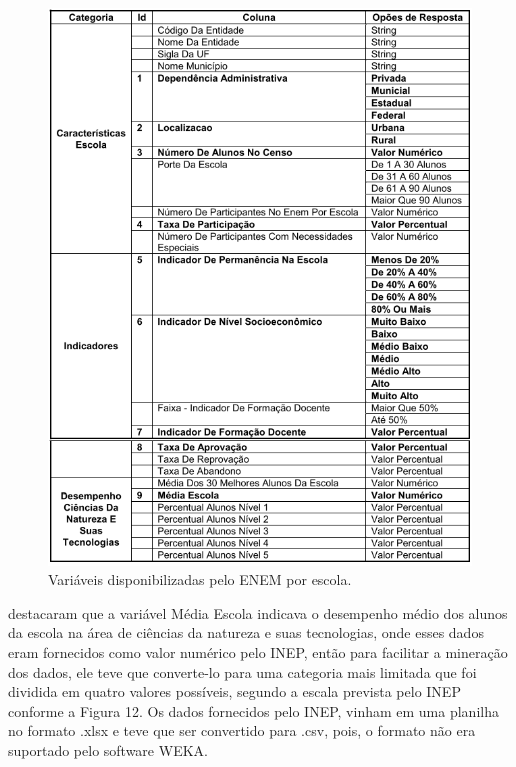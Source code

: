 \begin{figure}[!htp]
	\begin{center}
    \caption{\label{fig:waveform_fig} Variáveis disponibilizadas pelo ENEM por escola.}
	\includegraphics[scale=0.99]{Figuras/Tabela_ENEM.png}
	\end{center}
\end{figure}

\par
{} destacaram que a variável Média Escola indicava o desempenho médio dos alunos da escola na área de ciências da natureza e suas tecnologias, onde esses dados eram fornecidos como valor numérico pelo INEP, então para facilitar a mineração dos dados, ele teve que converte-lo para uma categoria mais limitada que foi dividida em quatro valores possíveis, segundo a escala prevista pelo INEP conforme a Figura 12. Os dados fornecidos pelo INEP, vinham em uma planilha no formato .xlsx e teve que ser convertido para .csv, pois, o formato não era suportado pelo software WEKA.


